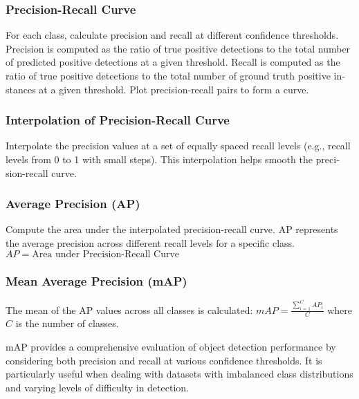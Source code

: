 \documentclass{article}
\begin{document}
\begin{latin}
\subsubsection*{Precision-Recall Curve}
    For each class, calculate precision and recall at different confidence thresholds.
    Precision is computed as the ratio of true positive detections to the total number of predicted positive detections at a given threshold.
    Recall is computed as the ratio of true positive detections to the total number of ground truth positive instances at a given threshold.
    Plot precision-recall pairs to form a curve.

\subsubsection*{Interpolation of Precision-Recall Curve}
    Interpolate the precision values at a set of equally spaced recall levels (e.g., recall levels from 0 to 1 with small steps).
    This interpolation helps smooth the precision-recall curve.

\subsubsection*{Average Precision (AP)}
    Compute the area under the interpolated precision-recall curve.
    AP represents the average precision across different recall levels for a specific class.
$
AP = \text{Area under Precision-Recall Curve}
$

\subsubsection*{Mean Average Precision (mAP)}
The mean of the AP values across all classes is calculated:
$
mAP = \frac{\sum_{i=1}^{C} AP_i}{C}
$
where \(C\) is the number of classes.

mAP provides a comprehensive evaluation of object detection performance by considering both precision and recall at various confidence thresholds. It is particularly useful when dealing with datasets with imbalanced class distributions and varying levels of difficulty in detection.
\end{latin}



\end{document}

